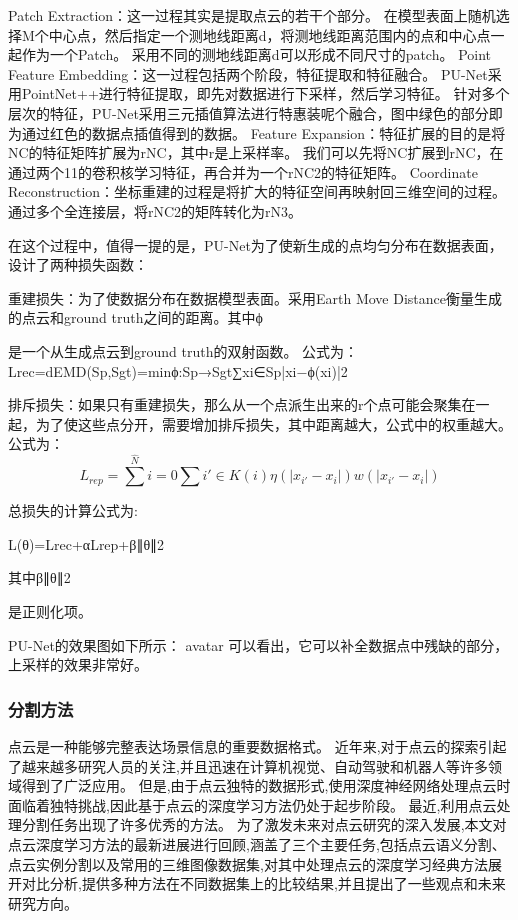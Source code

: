 \documentclass{amsart}
\begin{document}
Patch Extraction：这一过程其实是提取点云的若干个部分。
在模型表面上随机选择M个中心点，然后指定一个测地线距离d，将测地线距离范围内的点和中心点一起作为一个Patch。
采用不同的测地线距离d可以形成不同尺寸的patch。
Point Feature Embedding：这一过程包括两个阶段，特征提取和特征融合。
PU-Net采用PointNet++进行特征提取，即先对数据进行下采样，然后学习特征。
针对多个层次的特征，PU-Net采用三元插值算法进行特惠装呢个融合，图中绿色的部分即为通过红色的数据点插值得到的数据。
Feature Expansion：特征扩展的目的是将NC的特征矩阵扩展为rNC，其中r是上采样率。
我们可以先将NC扩展到rNC，在通过两个11的卷积核学习特征，再合并为一个rNC2的特征矩阵。
Coordinate Reconstruction：坐标重建的过程是将扩大的特征空间再映射回三维空间的过程。
通过多个全连接层，将rNC2的矩阵转化为rN3。

在这个过程中，值得一提的是，PU-Net为了使新生成的点均匀分布在数据表面，设计了两种损失函数：

    重建损失：为了使数据分布在数据模型表面。采用Earth Move Distance衡量生成的点云和ground truth之间的距离。其中ϕ

是一个从生成点云到ground truth的双射函数。
公式为：
Lrec=dEMD(Sp,Sgt)=minϕ:Sp→Sgt∑xi∈Sp|xi−ϕ(xi)|2

    排斥损失：如果只有重建损失，那么从一个点派生出来的r个点可能会聚集在一起，为了使这些点分开，需要增加排斥损失，其中距离越大，公式中的权重越大。
    公式为：$$L_{rep}=\sum^{\hat{N}}{i=0} \sum{i'\in K(i)} \eta (| x_{i'} -x_{i}|)w(| x_{i'}-x_{i} |)$$

总损失的计算公式为:

L(θ)=Lrec+αLrep+β∥θ∥2

其中β∥θ∥2

是正则化项。

PU-Net的效果图如下所示：
avatar
可以看出，它可以补全数据点中残缺的部分，上采样的效果非常好。

\subsubsection{分割方法}
\label{sec:05}
点云是一种能够完整表达场景信息的重要数据格式。
近年来,对于点云的探索引起了越来越多研究人员的关注,并且迅速在计算机视觉、自动驾驶和机器人等许多领域得到了广泛应用。
但是,由于点云独特的数据形式,使用深度神经网络处理点云时面临着独特挑战,因此基于点云的深度学习方法仍处于起步阶段。
最近,利用点云处理分割任务出现了许多优秀的方法。
为了激发未来对点云研究的深入发展,本文对点云深度学习方法的最新进展进行回顾,涵盖了三个主要任务,包括点云语义分割、点云实例分割以及常用的三维图像数据集,对其中处理点云的深度学习经典方法展开对比分析,提供多种方法在不同数据集上的比较结果,并且提出了一些观点和未来研究方向。

\end{document}
